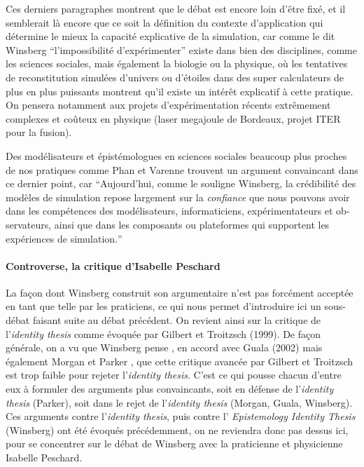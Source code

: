 Ces derniers paragraphes montrent que le débat est encore loin d'être fixé, et il semblerait là encore que ce soit la définition du contexte d'application qui détermine le mieux la capacité explicative de la simulation, car comme le dit Winsberg \enquote{l'impossibilité d'expérimenter} existe dans bien des disciplines, comme les sciences sociales, mais également la biologie ou la physique, où les tentatives de reconstitution simulées d'univers ou d'étoiles dans des super calculateurs de plus en plus puissants montrent qu'il existe un intérêt explicatif à cette pratique. On pensera notamment aux projets d'expérimentation récents extrêmement complexes et coûteux en physique (laser megajoule de Bordeaux, projet ITER pour la fusion).

Des modélisateurs et épistémologues en sciences sociales beaucoup plus proches de nos pratiques comme Phan et Varenne trouvent un argument convaincant dans ce dernier point, car \foreignquote{english}{Aujourd'hui, comme le souligne Winsberg, la crédibilité des modèles de simulation repose largement sur la \textit{confiance} que nous pouvons avoir dans les compétences des modélisateurs, informaticiens, expérimentateurs et observateurs, ainsi que dans les composants ou plateformes qui supportent les expériences de simulation.} \autocite{Phan2008}

\paragraph{Controverse, la critique d'Isabelle Peschard}

La façon dont Winsberg construit son argumentaire n'est pas forcément acceptée en tant que telle par les praticiens, ce qui nous permet d'introduire ici un sous-débat faisant suite au débat précédent. On revient ainsi sur la critique de l'\textit{identity thesis} comme évoquée par Gilbert et Troitzsch (1999). De façon générale, on a vu que Winsberg pense , en accord avec Guala (2002) \autocite{Winsberg2009} mais également Morgan  et Parker \autocite{Winsberg2013}, que cette critique avancée par Gilbert et Troitzsch est trop faible pour rejeter l'\textit{identity thesis}. C'est ce qui pousse chacun d'entre eux à formuler des arguments plus convaincants, soit en défense de l'\textit{identity thesis} (Parker), soit dans le rejet de l'\textit{identity thesis} (Morgan, Guala, Winsberg). Ces arguments contre l'\textit{identity thesis}, puis contre l' \textit{Epistemology Identity Thesis} (Winsberg) ont été évoqués précédemment, on ne reviendra donc pas dessus ici, pour se concentrer sur le débat de Winsberg avec la praticienne et physicienne Isabelle Peschard.


